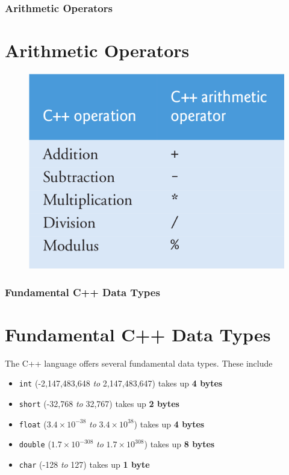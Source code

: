 \documentclass{beamer}
\begin{document}
\begin{frame}
    \frametitle{Arithmetic Operators}
    \section{Arithmetic Operators} %
    \label{sec:arithmetic}
    \begin{figure}
        \centering
        \includegraphics[scale=0.4]{arithematic}
    \end{figure}
\end{frame}

\begin{frame}
    \frametitle{Fundamental C++ Data Types}
    \section{Fundamental C++ Data Types} %
    \label{sec:fundamental_data_types}
    The C++ language offers several fundamental data types. These include
    \begin{itemize}
        \item \texttt{int} (-2,147,483,648 \textit{to} 2,147,483,647) takes up \textbf{4 bytes}
        \item \texttt{short} (-32,768 \textit{to} 32,767) takes up \textbf{2 bytes}
        \item \texttt{float} ($3.4\times10^{-38}$ \textit{to} $3.4\times10^{38}$) takes up \textbf{4 bytes}
        \item \texttt{double} ($1.7\times10^{-308}$ \textit{to} $1.7\times10^{308}$) takes up \textbf{8 bytes}
       
        \item \texttt{char} (-128 \textit{to} 127) takes up \textbf{1 byte}
    \end{itemize}
\end{frame}
\end{document}
